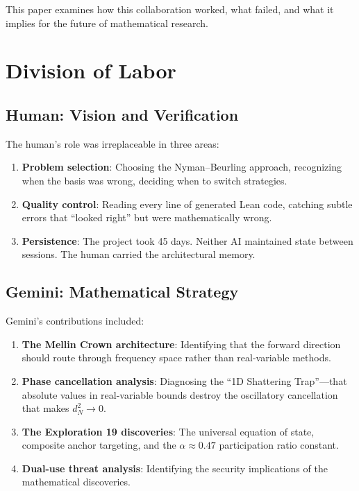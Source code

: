 \documentclass[11pt,a4paper]{article}
\begin{document}
This paper examines how this collaboration worked, what failed,
and what it implies for the future of mathematical research.

\section{Division of Labor}

\subsection{Human: Vision and Verification}

The human's role was irreplaceable in three areas:
\begin{enumerate}
  \item \textbf{Problem selection}: Choosing the Nyman--Beurling
    approach, recognizing when the basis was wrong, deciding when
    to switch strategies.
  \item \textbf{Quality control}: Reading every line of generated
    Lean code, catching subtle errors that ``looked right'' but
    were mathematically wrong.
  \item \textbf{Persistence}: The project took 45 days. Neither AI
    maintained state between sessions. The human carried the
    architectural memory.
\end{enumerate}

\subsection{Gemini: Mathematical Strategy}

Gemini's contributions included:
\begin{enumerate}
  \item \textbf{The Mellin Crown architecture}: Identifying that the
    forward direction should route through frequency space rather
    than real-variable methods.
  \item \textbf{Phase cancellation analysis}: Diagnosing the
    ``1D Shattering Trap''---that absolute values in real-variable
    bounds destroy the oscillatory cancellation that makes
    $d_N^2 \to 0$.
  \item \textbf{The Exploration 19 discoveries}: The universal
    equation of state, composite anchor targeting, and the
    $\alpha \approx 0.47$ participation ratio constant.
  \item \textbf{Dual-use threat analysis}: Identifying the security
    implications of the mathematical discoveries.
\end{enumerate}
\end{document}
